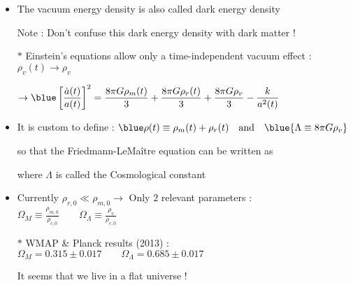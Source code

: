 \Tr
\begin{itemize}
\item The vacuum energy density is also called {\blue dark energy density}
\item[] Note : Don't confuse this dark energy density with dark matter !
\item[$\ast$] Einstein's equations allow only a {\red time-independent vacuum effect} :
        $\rho_{v}(t) \rightarrow \rho_{v}$
\item[] $\displaystyle \rightarrow {\blue \left[\frac{\dot{a}(t)}{a(t)}\right]^{2}=
         \frac{8\pi G\rho_{m}(t)}{3}+\frac{8\pi G\rho_{r}(t)}{3}+\frac{8\pi G\rho_{v}}{3}
         -\frac{k}{a^{2}(t)}}$
\item It is custom to define : ${\blue \rho(t) \equiv \rho_{m}(t)+\rho_{r}(t)} \text{~~~and~~~} \blue{\Lambda \equiv 8\pi G\rho_{v}}$
\item[] so that the Friedmann-LeMa\^{i}tre equation can be written as
\item[] \begin{center}
        {\red {}}
        \end{center}
\item[] where {\blue $\Lambda$} is called the {\blue Cosmological constant}
\item Currently $\rho_{r,0} \ll \rho_{m,0} \rightarrow$ Only $2$ relevant parameters :
      {\blue $\displaystyle \Omega_{M} \equiv \frac{\rho_{m,0}}{\rho_{c,0}} \qquad
      \Omega_{\Lambda} \equiv \frac{\rho_{v}}{\rho_{c,0}}$}
\item[$\ast$] WMAP \& Planck results (2013) : {\red $\Omega_{M}=0.315 \pm 0.017 \qquad \Omega_{\Lambda}=0.685 \pm 0.017$}
\item[] {\blue It seems that we live in a flat universe !}
\end{itemize}
